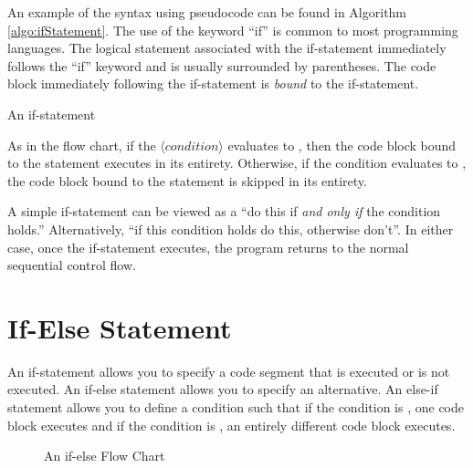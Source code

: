 %

An example of the syntax using pseudocode can be found in Algorithm \ref{algo:ifStatement}.
The use of the keyword ``if'' is common to most programming languages.  The 
logical statement associated with the if-statement immediately follows the 
``if'' keyword and is usually surrounded by parentheses.  The code block 
immediately following the if-statement is \emph{bound} to the if-statement. 

\begin{algorithm}[H]
\caption{An if-statement}
\label{algo:ifStatement}
\end{algorithm}

As in the flow chart, if the $\langle condition\rangle$ evaluates to \True, then the 
code block bound to the statement executes in its entirety.  Otherwise, if the
condition evaluates to \False, the code block bound to the statement is
skipped in its entirety.

A simple if-statement can be viewed as a ``do this if \emph{and only if} 
the condition holds.''  Alternatively, ``if this condition holds do this, otherwise 
don't''.  In either case, once the if-statement executes, the program returns
to the normal sequential control flow.  

\section{If-Else Statement}

An if-statement allows you to specify a code segment that is executed or
is not executed.  An if-else statement allows you to specify an alternative.
An else-if statement allows you to define a condition such that if the 
condition is \True, one code block executes and if the condition is \False, 
an entirely different code block executes.

\begin{wrapfigure}[25]{R}{0.5\textwidth}
\centering

\caption{An if-else Flow Chart}
\label{figure:ifElseFlowChart}
\end{wrapfigure}

%

